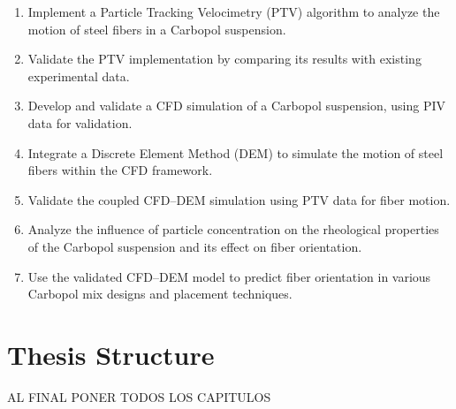 \begin{enumerate}
    \item Implement a Particle Tracking Velocimetry (PTV) algorithm to analyze the motion of steel fibers in a Carbopol suspension.
    \item Validate the PTV implementation by comparing its results with existing experimental data.
    \item Develop and validate a CFD simulation of a Carbopol suspension, using PIV data for validation.
    \item Integrate a Discrete Element Method (DEM) to simulate the motion of steel fibers within the CFD framework.
    \item Validate the coupled CFD–DEM simulation using PTV data for fiber motion.
    \item Analyze the influence of particle concentration on the rheological properties of the Carbopol suspension and its effect on fiber orientation.
    \item Use the validated CFD–DEM model to predict fiber orientation in various Carbopol mix designs and placement techniques.
\end{enumerate}

\section{Thesis Structure}

AL FINAL PONER TODOS LOS CAPITULOS